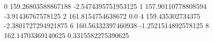 0 159.26803588867188 -2.5474395751953125
1 157.90110778808594 -3.91436767578125
2 161.8154754638672 0.0
4 159.435302734375 -2.3801727294921875
6 160.56332397460938 -1.2521514892578125
8 162.14703369140625 0.3315582275390625
